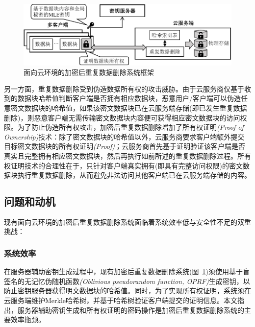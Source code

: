\begin{figure}[!htb]
    \small
    \centering
    \includegraphics[width=\textwidth]{pic/background/Cloud-encrypted-deduplication-logic.pdf}
    \caption{面向云环境的加密后重复数据删除系统框架}
    \label{fig:Cloud-based-encrypted-deduplication-storage-logic}
\end{figure}

另一方面，重复数据删除受到伪造数据所有权的攻击威胁\cite{harnik2010side,mulazzani11}。由于云服务商仅基于收到的数据块哈希值判断客户端是否拥有相应数据块，恶意用户/客户端可以伪造任意密文数据块的哈希值，如果该密文数据块已在云服务端存储(即已发生重复数据删除)，则恶意客户端无需传输密文数据块内容便可获得相应密文数据块的访问权限。为了防止伪造所有权攻击，加密后重复数据删除增加了所有权证明\textit{(Proof-of-Ownership)}技术\cite{halevi11}：除了密文数据块的哈希值以外，云服务商要求客户端额外提交目标密文数据块的所有权证明\textit{(Proof)}；云服务商首先基于证明验证该客户端是否真实且完整拥有相应密文数据块，然后再执行如前所述的重复数据删除过程。所有权证明技术的合理性在于，只针对客户端真实拥有(即具有完整访问权限)的密文数据块执行重复数据删除，从而避免非法访问其他客户端已在云服务端存储的内容。

\subsection{问题和动机}
\label{subsec:intro-problem}

现有面向云环境的加密后重复数据删除系统面临着系统效率低与安全性不足的双重挑战：

\subsubsection{系统效率}
\label{subsubsec:intro-problem-performance}

在服务器辅助密钥生成过程中，现有加密后重复数据删除系统(图~\ref{fig:Cloud-based-encrypted-deduplication-storage-logic})须使用基于盲签名\cite{armknecht2015transparent,bellare2013DupLESS}的无记忆伪随机函数\textit{(Oblivious pseudorandom function, OPRF)}生成密钥\cite{bellare2013DupLESS}，以防止密钥服务器获得明文数据块的哈希值。同时，为了实现所有权证明，系统须在云服务端维护Merkle哈希树，并基于哈希树验证客户端提交的证明信息\cite{halevi2011proofs}。本文指出，服务器辅助密钥生成和所有权证明的密码操作是加密后重复数据删除系统的主要效率瓶颈。

